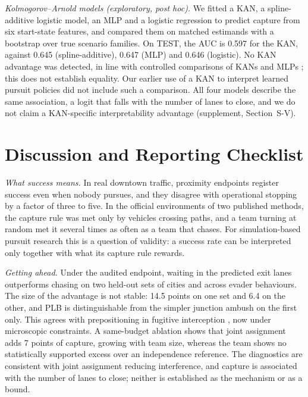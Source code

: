 \documentclass[5p,twocolumn]{elsarticle}
\begin{document}
\emph{Kolmogorov--Arnold models (exploratory, post hoc).} We fitted a KAN, a spline-additive logistic model, an MLP
and a logistic regression to predict capture from six start-state features, and compared them on matched estimands
with a bootstrap over true scenario families. On TEST, the AUC is 0.597 for the KAN, against 0.645 (spline-additive),
0.647 (MLP) and 0.646 (logistic). No KAN advantage was detected, in line with controlled comparisons of KANs and MLPs
\cite{yu2024kanfair}; this does not establish equality. Our earlier use of a KAN to interpret learned pursuit
policies \cite{noguera2025kan} did not include such a comparison. All four models describe the same association, a logit that
falls with the number of lanes to close, and we do not claim a KAN-specific interpretability advantage (supplement,
Section~S-V).

\section{Discussion and Reporting Checklist}
\label{sec:discussion}

\emph{What success means.} In real downtown traffic, proximity endpoints register success even when nobody pursues,
and they disagree with operational stopping by a factor of three to five. In the official environments of two
published methods, the capture rule was met only by vehicles crossing paths, and a team turning at random met it
several times as often as a team that chases. For simulation-based pursuit research this is a question of validity:
a success rate can be interpreted only together with what its capture rule rewards.

\emph{Getting ahead.} Under the audited endpoint, waiting in the predicted exit lanes outperforms chasing on two
held-out sets of cities and across evader behaviours. The size of the advantage is not stable: 14.5 points on one
set and 6.4 on the other, and PLB is distinguishable from the simpler junction ambush on the first only. This agrees
with prepositioning in fugitive interception \cite{vandroffelaar2024simopt}, now under microscopic constraints. A
same-budget ablation shows that joint assignment adds 7 points of capture, growing with team size, whereas the team
shows no statistically supported excess over an independence reference. The diagnostics are consistent with joint
assignment reducing interference, and capture is associated with the number of lanes to close; neither is established
as the mechanism or as a bound.
\end{document}
